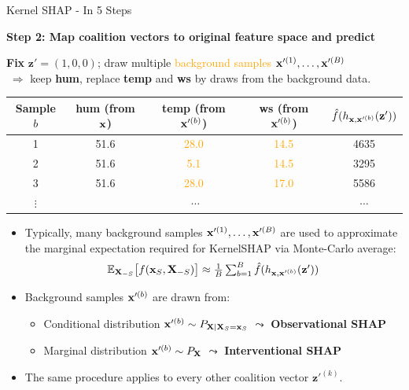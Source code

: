 \documentclass[10pt,compress,t,notes=noshow, xcolor=table]{beamer}
\begin{document}
\begin{frame}{Kernel SHAP - In 5 Steps}

\textbf{Step 2: Map coalition vectors to original feature space and predict}

\medskip

\textbf{Fix} \(\mathbf{z}'=(1,0,0)\); draw multiple \textcolor{orange}{background samples $\mathbf{x}'^{(1)}, \dots, \mathbf{x}'^{(B)}$}\\
\(\;\Rightarrow\) keep \textbf{hum}, replace \textbf{temp} and \textbf{ws} by draws from the background data.

\begin{table}\centering\small
\begin{tabular}{c|ccc|c}
Sample \(b\) & hum (from \(\mathbf{x}\)) & temp (from $\mathbf{x}'^{(b)}$) & ws (from $\mathbf{x}'^{(b)}$)  & \(\hat{f}(h_{\mathbf{x}, \mathbf{x}'^{(b)}}(\mathbf{z}'))\) \\
\hline
1 & 51.6 & \textcolor{orange}{28.0} & \textcolor{orange}{14.5} & 4635 \\
2 & 51.6 & \textcolor{orange}{5.1} & \textcolor{orange}{14.5} & 3295 \\
3 & 51.6 & \textcolor{orange}{28.0} & \textcolor{orange}{17.0} & 5586 \\
$\vdots$ & \multicolumn{3}{c}{$\cdots$} & $\cdots$ \\
\end{tabular}
\end{table}


\begin{itemize}
  \item Typically, many background samples $\mathbf{x}'^{(1)}, \dots, \mathbf{x}'^{(B)}$ are used to approximate the marginal expectation required for KernelSHAP via Monte-Carlo average:
  $$ \textstyle \mathbb{E}_{\mathbf{X}_{-S}}\bigl[f(\mathbf{x}_S,\mathbf{X}_{-S})\bigr] \approx
\frac{1}{B}\sum_{b=1}^{B}\hat{f}(h_{\mathbf{x}, \mathbf{x}'^{(b)}}(\mathbf{z}'))$$
\item Background samples \( \mathbf{x}'^{(b)} \) are drawn from:
\begin{itemize}
  \item Conditional distribution \( \mathbf{x}'^{(b)} \sim P_{\mathbf{X} \mid \mathbf{X}_S = \mathbf{x}_S} \) $\leadsto$ \textbf{Observational SHAP} 
  \item Marginal distribution \( \mathbf{x}'^{(b)} \sim P_{\mathbf{X}} \) $\leadsto$  \textbf{Interventional SHAP}
\end{itemize}

\item The same procedure applies to every other coalition vector \(\mathbf{z}'^{(k)}\).
\end{itemize}

\end{frame}
\end{document}
